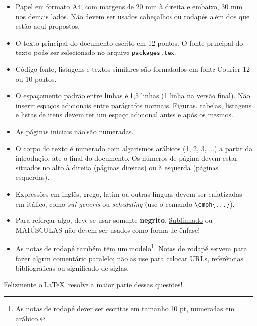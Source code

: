 \begin{itemize}

\item Papel em formato A4, com margens de 20 mm à direita e embaixo, 30 mm nos demais lados. Não devem ser usados cabeçalhos ou rodapés além dos que estão aqui propostos.

\item O texto principal do documento escrito em 12 pontos. O fonte principal do texto pode ser selecionado no arquivo \verb#packages.tex#.

\item Código-fonte, listagens e textos similares são formatados em fonte Courier 12 ou 10 pontos.

\item O espaçamento padrão entre linhas é 1,5 linhas (1 linha na versão final). Não inserir espaços adicionais entre parágrafos normais. Figuras, tabelas, listagens e listas de itens devem ter um espaço adicional antes e após os mesmos.

\item As páginas iniciais não são numeradas.

\item O corpo do texto é numerado com algarismos arábicos (1, 2, 3, ...) a partir da introdução, ate o final do documento. Os números de página devem estar situados no alto à direita (páginas direitas) ou à esquerda (páginas esquerdas).

\item Expressões em inglês, grego, latim ou outras línguas devem ser enfatizadas em itálico, como \emph{sui generis} ou \emph{scheduling} (use o comando \verb#\emph{...}#).

\item Para reforçar algo, deve-se usar somente \textbf{negrito}. \underline{Sublinhado} ou MAIÚSCULAS não devem ser usados como forma de ênfase!

\item As notas de rodapé também têm um modelo\footnote{As notas de rodapé dever ser escritas em tamanho 10 pt, numeradas em arábico.}. Notas de rodapé servem para fazer algum comentário paralelo; não as use para colocar URLs, referências bibliográficas ou significado de siglas.

\end{itemize}

Felizmente o \LaTeX\ resolve a maior parte dessas questões!

